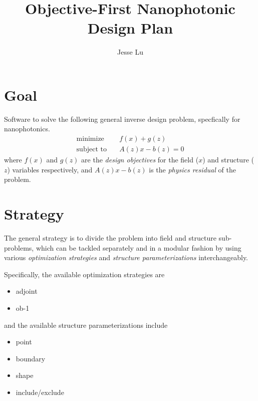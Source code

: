 \documentclass{article}
\title{Objective-First Nanophotonic Design Plan}
\author{Jesse Lu}
\newcommand{\E}[2]{\begin{subequations}\begin{align}#1\end{align}\label{eq:#2}\end{subequations}}
\DeclareMathOperator*{\minimize}{\text{minimize}\quad}
\newcommand{\subto}{\text{subject to}\quad}
\newcommand{\BI}{\begin{itemize}\item}
\newcommand{\EI}{\end{itemize}}
\newcommand{\I}{\item}
\begin{document}
\maketitle
\tableofcontents

\section{Goal}
    Software to solve the following general inverse design problem, specfically for nanophotonics.
    \E{ \minimize&  f(x) + g(z) \\
        \subto&     A(z)x - b(z) = 0}{prob}
    where $f(x)$ and $g(z)$ are the \emph{design objectives} for the field ($x$) and structure ($z$) variables respectively,
    and $A(z)x - b(z)$ is the \emph{physics residual} of the problem.

\section{Strategy}
    The general strategy is to divide the problem 
        into field and structure sub-problems,
        which can be tackled separately and in a modular fashion
        by using various
        \emph{optimization strategies} and 
        \emph{structure parameterizations}
        interchangeably.

    Specifically, the available optimization strategies are
    \BI adjoint
    \I  ob-1    \EI
    and the available structure parameterizations include
    \BI point
    \I  boundary
    \I  shape
    \I  include/exclude \EI
\end{document}
